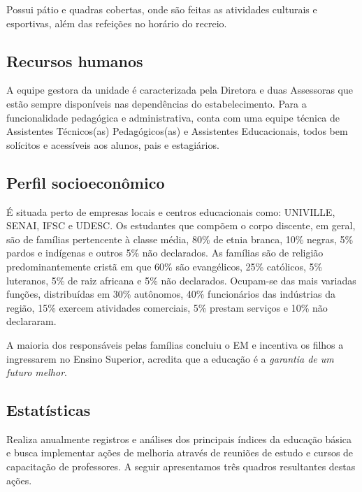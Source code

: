 Possui pátio e quadras cobertas, onde são feitas as atividades culturais e esportivas, além das refeições no horário do recreio.

\subsection{Recursos humanos}
A equipe gestora da unidade é caracterizada pela Diretora e duas Assessoras que estão sempre disponíveis nas dependências do estabelecimento. Para a funcionalidade pedagógica e administrativa, conta com uma equipe técnica de Assistentes Técnicos(as) Pedagógicos(as) e Assistentes Educacionais, todos bem solícitos e acessíveis aos alunos, pais e estagiários.

\subsection{Perfil socioeconômico}
É situada perto de empresas locais e centros educacionais como: UNIVILLE, SENAI, IFSC e UDESC. Os estudantes que compõem o corpo discente, em geral, são de famílias pertencente à classe média, 80\% de etnia branca, 10\% negras, 5\% pardos e indígenas e outros 5\% não declarados. As famílias são de religião predominantemente cristã em que 60\% são evangélicos, 25\% católicos, 5\% luteranos, 5\% de raiz africana e 5\% não declarados. Ocupam-se das mais variadas funções, distribuídas em 30\% autônomos, 40\% funcionários das indústrias da região, 15\% exercem atividades comerciais, 5\% prestam serviços e 10\% não declararam.

A maioria dos responsáveis pelas famílias concluiu o EM e incentiva os filhos a ingressarem no Ensino Superior, acredita que a educação é a \emph{garantia de um futuro melhor}.

\subsection{Estatísticas}
Realiza anualmente registros e análises dos principais índices da educação básica e busca implementar ações de melhoria através de reuniões de estudo e cursos de capacitação de professores. A seguir apresentamos três quadros resultantes destas ações.

